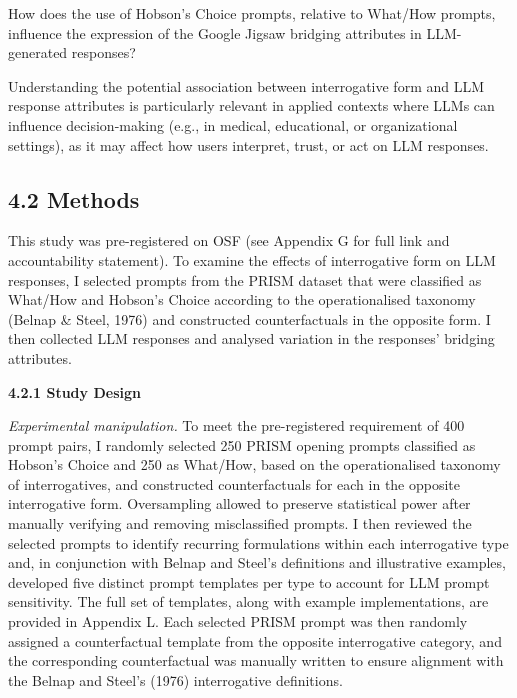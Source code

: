 \documentclass[
  12pt,
]{article}
\begin{document}
\begin{adjustwidth}{2em}{2em}
How does the use of Hobson’s Choice prompts, relative to What/How prompts, influence the expression of the Google Jigsaw bridging attributes in LLM-generated responses?
\end{adjustwidth}

Understanding the potential association between interrogative form and LLM response attributes is particularly relevant in applied contexts where LLMs can influence decision-making (e.g., in medical, educational, or organizational settings), as it may affect how users interpret, trust, or act on LLM responses.

\subsection{4.2 Methods}\label{methods-1}

This study was pre-registered on OSF (see Appendix G for full link and accountability statement). To examine the effects of interrogative form on LLM responses, I selected prompts from the PRISM dataset that were classified as What/How and Hobson's Choice according to the operationalised taxonomy (Belnap \& Steel, 1976) and constructed counterfactuals in the opposite form. I then collected LLM responses and analysed variation in the responses' bridging attributes.

\textbf{4.2.1 Study Design}

\emph{Experimental manipulation.} To meet the pre-registered requirement of 400 prompt pairs, I randomly selected 250 PRISM opening prompts classified as Hobson's Choice and 250 as What/How, based on the operationalised taxonomy of interrogatives, and constructed counterfactuals for each in the opposite interrogative form. Oversampling allowed to preserve statistical power after manually verifying and removing misclassified prompts. I then reviewed the selected prompts to identify recurring formulations within each interrogative type and, in conjunction with Belnap and Steel's definitions and illustrative examples, developed five distinct prompt templates per type to account for LLM prompt sensitivity. The full set of templates, along with example implementations, are provided in Appendix L. Each selected PRISM prompt was then randomly assigned a counterfactual template from the opposite interrogative category, and the corresponding counterfactual was manually written to ensure alignment with the Belnap and Steel's (1976) interrogative definitions.
\end{document}
